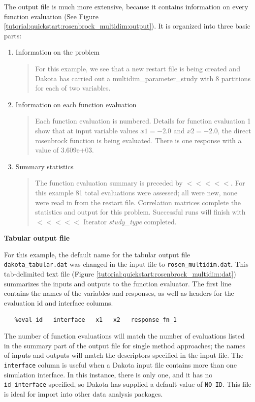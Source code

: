 The output file is much more extensive, because it
contains information on every function evaluation (See Figure
\ref{tutorial:quickstart:rosenbrock_multidim:output}). It is 
organized into three basic parts:
\begin{enumerate}
\item Information on the problem
\begin{quote}
For this example, we see that a new restart file is being created
and Dakota has carried out a multidim\_parameter\_study with
8 partitions for each of two variables.
\end{quote}
\item Information on each function evaluation 
\begin{quote}
Each function evaluation is numbered. Details for function evaluation
1 show that at input variable values $x1= -2.0$ and $x2=-2.0$, 
the direct rosenbrock function is being evaluated.  There is one response
with a value of 3.609e+03.
\end{quote}
\item Summary statistics
\begin{quote}
The function evaluation summary is preceded by $<<<<<$. For this
example 81 total evaluations were assessed; all were new, none were
read in from the restart file. Correlation matrices complete the statistics
and output for this problem. Successful runs will finish with
$<<<<<$ Iterator {\it study\_type} completed.
\end{quote}
\end{enumerate}

{\textbf{Tabular output file}}

For this example, the default name for the tabular output file 
\texttt{dakota\_tabular.dat} was changed in the input file to
\texttt{rosen\_multidim.dat}. This tab-delimited text file
(Figure \ref{tutorial:quickstart:rosenbrock_multidim:dat})
summarizes the inputs and outputs to the function evaluator.
The first line contains the names of the variables and responses,
as well as headers for the evaluation id and interface columns.
\begin{verbatim}
   %eval_id   interface   x1   x2   response_fn_1 
\end{verbatim}
The number of function evaluations will match the number of 
evaluations listed in the summary part of the output file for
single method approaches; the names of inputs and outputs will match 
the descriptors specified in the input file. The \texttt{interface} 
column is useful when a Dakota input file contains more than one 
simulation interface. In this instance, there is only one, and
it has no \texttt{id\_interface} specified, so Dakota has supplied
a default value of \texttt{NO\_ID}. This file is ideal for import into
other data analysis packages.



